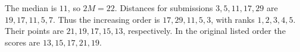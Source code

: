 The median is $11$, so $2M=22$. Distances for submissions $3,5,11,17,29$ are $19,17,11,5,7$. Thus the increasing order is $17,29,11,5,3$, with ranks $1,2,3,4,5$. Their points are $21,19,17,15,13$, respectively. In the original listed order the scores are $\boxed{13,15,17,21,19}$.
